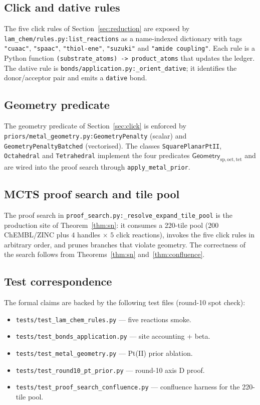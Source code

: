 \documentclass{article}
\theoremstyle{definition}
\begin{document}
\subsection{Click and dative rules}
The five click rules of Section~\ref{sec:reduction} are exposed by
\texttt{lam\_chem/rules.py:list\_reactions} as a name-indexed dictionary
with tags \texttt{"cuaac"}, \texttt{"spaac"}, \texttt{"thiol-ene"},
\texttt{"suzuki"} and \texttt{"amide coupling"}. Each rule is a Python
function \texttt{(substrate\_atoms) -> product\_atoms} that updates the
ledger. The dative rule is \texttt{bonds/application.py:\_orient\_dative};
it identifies the donor/acceptor pair and emits a \texttt{dative} bond.

\subsection{Geometry predicate}
The geometry predicate of Section~\ref{sec:click} is enforced by
\texttt{priors/metal\_geometry.py:GeometryPenalty} (scalar) and
\texttt{GeometryPenaltyBatched} (vectorised). The classes
\texttt{SquarePlanarPtII}, \texttt{Octahedral} and \texttt{Tetrahedral}
implement the four predicates $\mathsf{Geometry}_{\mathrm{sp},
\mathrm{oct}, \mathrm{tet}}$ and are wired into the proof search through
\texttt{apply\_metal\_prior}.

\subsection{MCTS proof search and tile pool}
The proof search in \texttt{proof\_search.py:\_resolve\_expand\_tile\_pool}
is the production site of Theorem~\ref{thm:sn}: it consumes a 220-tile pool
(200 ChEMBL/ZINC plus $4$ handles $\times$ $5$ click reactions), invokes
the five click rules in arbitrary order, and prunes branches that
violate geometry. The correctness of the search follows from
Theorems~\ref{thm:sn} and~\ref{thm:confluence}.

\subsection{Test correspondence}
The formal claims are backed by the following test files (round-10 spot
check):
\begin{itemize}
  \item \texttt{tests/test\_lam\_chem\_rules.py} — five reactions smoke.
  \item \texttt{tests/test\_bonds\_application.py} — site accounting + beta.
  \item \texttt{tests/test\_metal\_geometry.py} — Pt(II) prior ablation.
  \item \texttt{tests/test\_round10\_pt\_prior.py} — round-10 axis D proof.
  \item \texttt{tests/test\_proof\_search\_confluence.py} — confluence
        harness for the 220-tile pool.
\end{itemize}
\end{document}
